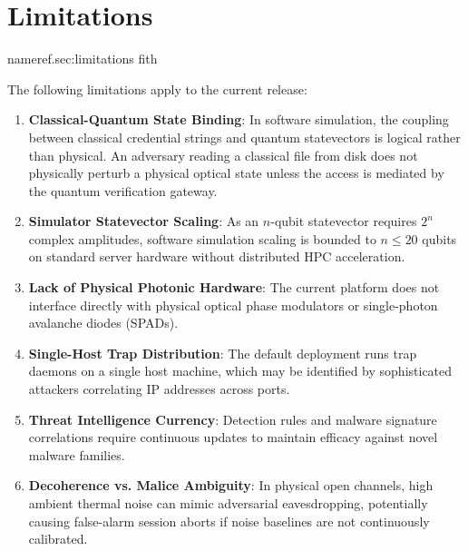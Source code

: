 \documentclass[journal,10pt]{IEEEtran}
\makeatletter
\let\orig@label\label
\def\label#1{%
  \orig@label{#1}%
  \pdfdest name{ref.#1} fith\relax
}
\makeatother
\begin{document}
\section{Limitations}\label{sec:limitations}
The following limitations apply to the current release:
\begin{enumerate}
    \item \textbf{Classical-Quantum State Binding}: In software simulation, the coupling between classical credential strings and quantum statevectors is logical rather than physical. An adversary reading a classical file from disk does not physically perturb a physical optical state unless the access is mediated by the quantum verification gateway.
    \item \textbf{Simulator Statevector Scaling}: As an $n$-qubit statevector requires $2^n$ complex amplitudes, software simulation scaling is bounded to $n \le 20$ qubits on standard server hardware without distributed HPC acceleration.
    \item \textbf{Lack of Physical Photonic Hardware}: The current platform does not interface directly with physical optical phase modulators or single-photon avalanche diodes (SPADs).
    \item \textbf{Single-Host Trap Distribution}: The default deployment runs trap daemons on a single host machine, which may be identified by sophisticated attackers correlating IP addresses across ports.
    \item \textbf{Threat Intelligence Currency}: Detection rules and malware signature correlations require continuous updates to maintain efficacy against novel malware families.
    \item \textbf{Decoherence vs. Malice Ambiguity}: In physical open channels, high ambient thermal noise can mimic adversarial eavesdropping, potentially causing false-alarm session aborts if noise baselines are not continuously calibrated.
\end{enumerate}
\end{document}
